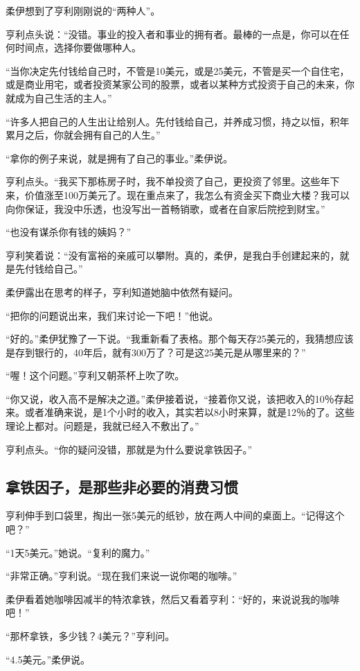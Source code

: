 柔伊想到了亨利刚刚说的“两种人”。

亨利点头说：“没错。事业的投入者和事业的拥有者。最棒的一点是，你可以在任何时间点，选择你要做哪种人。

“当你决定先付钱给自己时，不管是10美元，或是25美元，不管是买一个自住宅，或是商业用宅，或者投资某家公司的股票，或者以某种方式投资于自己的未来，你就成为自己生活的主人。”

“许多人把自己的人生出让给别人。先付钱给自己，并养成习惯，持之以恒，积年累月之后，你就会拥有自己的人生。”

“拿你的例子来说，就是拥有了自己的事业。”柔伊说。

亨利点头。“我买下那栋房子时，我不单投资了自己，更投资了邻里。这些年下来，价值涨至100万美元了。现在重点来了，我怎么有资金买下商业大楼？我可以向你保证，我没中乐透，也没写出一首畅销歌，或者在自家后院挖到财宝。”

“也没有谋杀你有钱的姨妈？”

亨利笑着说：“没有富裕的亲戚可以攀附。真的，柔伊，是我白手创建起来的，就是先付钱给自己。”

柔伊露出在思考的样子，亨利知道她脑中依然有疑问。

“把你的问题说出来，我们来讨论一下吧！”他说。

“好的。”柔伊犹豫了一下说。“我重新看了表格。那个每天存25美元的，我猜想应该是存到银行的，40年后，就有300万了？可是这25美元是从哪里来的？”

“喔！这个问题。”亨利又朝茶杯上吹了吹。

“你又说，收入高不是解决之道。”柔伊接着说，“接着你又说，该把收入的10％存起来。或者准确来说，是1个小时的收入，其实若以8小时来算，就是12％的了。这些理论上都对。问题是，我就已经入不敷出了。”

亨利点头。“你的疑问没错，那就是为什么要说拿铁因子。”

\subsection{拿铁因子，是那些非必要的消费习惯}

亨利伸手到口袋里，掏出一张5美元的纸钞，放在两人中间的桌面上。“记得这个吧？”

“1天5美元。”她说。“复利的魔力。”

“非常正确。”亨利说。“现在我们来说一说你喝的咖啡。”

柔伊看着她咖啡因减半的特浓拿铁，然后又看着亨利：“好的，来说说我的咖啡吧！”

“那杯拿铁，多少钱？4美元？”亨利问。

“4.5美元。”柔伊说。

